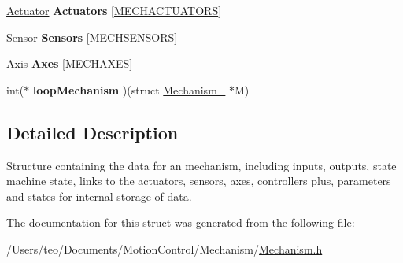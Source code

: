 \begin{DoxyCompactItemize}
\mbox{\label{struct_mechanism___a249f979e73921aee5c1d76602612c6a7}} 
\hyperlink{struct_actuator__}{Actuator} {\bfseries Actuators} \mbox{[}\hyperlink{_mechanism_8h_a0cf5b42728552f65e8f9d570bdd05b56}{M\+E\+C\+H\+A\+C\+T\+U\+A\+T\+O\+RS}\mbox{]}
\item 
\mbox{\label{struct_mechanism___a83e597c40ede86875129727b103f81bb}} 
\hyperlink{struct_sensor__}{Sensor} {\bfseries Sensors} \mbox{[}\hyperlink{_mechanism_8h_a654d9b5b9af65f6b5870840708d1e6c3}{M\+E\+C\+H\+S\+E\+N\+S\+O\+RS}\mbox{]}
\item 
\mbox{\label{struct_mechanism___a3397ca01d022348c15408938c219592d}} 
\hyperlink{struct_axis__}{Axis} {\bfseries Axes} \mbox{[}\hyperlink{_mechanism_8h_a1fbdf028a4b1aa161417e430d2d7809c}{M\+E\+C\+H\+A\+X\+ES}\mbox{]}
\item 
\mbox{\label{struct_mechanism___a1ef16857f71bb4e7c8735287d631723c}} 
int($\ast$ {\bfseries loop\+Mechanism} )(struct \hyperlink{struct_mechanism__}{Mechanism\+\_\+} $\ast$M)
\end{DoxyCompactItemize}


\subsection{Detailed Description}
Structure containing the data for an mechanism, including inputs, outputs, state machine state, links to the actuators, sensors, axes, controllers plus, parameters and states for internal storage of data. 

The documentation for this struct was generated from the following file\+:\begin{DoxyCompactItemize}
\item 
/\+Users/teo/\+Documents/\+Motion\+Control/\+Mechanism/\hyperlink{_mechanism_8h}{Mechanism.\+h}\end{DoxyCompactItemize}
